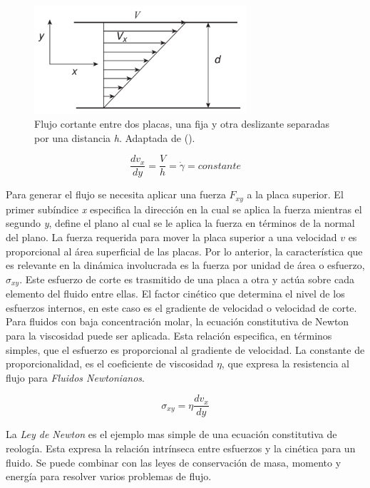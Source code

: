 \begin{figure}\centering
    \includegraphics[width=0.7\textwidth]{Graphics/reo1.png}
    \caption[Flujo entre placas]{Flujo cortante entre dos placas, una fija y otra deslizante separadas por una distancia \emph{h}. Adaptada de ().}
    \label{fig:reo1}
\end{figure}

\begin{equation}
\frac{dv_{x}}{dy}= \frac{V}{h}=\dot{\gamma}=constante
\end{equation}

Para generar el flujo se necesita aplicar una fuerza \emph{$F_{xy}$} a la placa superior. El primer subíndice \emph{x} especifica la dirección en la cual se aplica la fuerza mientras el segundo \emph{y}, define el plano al cual se le aplica la fuerza en términos de la normal del plano. La fuerza requerida para mover la placa superior a una velocidad $v$ es proporcional al área superficial de las placas. Por lo anterior, la característica que es relevante en la dinámica involucrada es la fuerza por unidad de área o esfuerzo, $\sigma_{xy}$. Este esfuerzo de corte es trasmitido de una placa a otra y actúa sobre cada elemento del fluido entre ellas. El factor cinético que determina el nivel de los esfuerzos internos, en este caso es el gradiente de velocidad o velocidad de corte. Para fluidos con baja concentración molar, la ecuación constitutiva de Newton para la viscosidad puede ser aplicada. Esta relación especifica, en términos simples, que el esfuerzo es proporcional al gradiente de velocidad. La constante de proporcionalidad, es el coeficiente de viscosidad $\eta$, que expresa la resistencia al flujo para \emph{Fluidos Newtonianos}.

\begin{equation}
\sigma_{xy}=\eta \frac{dv_{x}}{dy}
\end{equation}

La \emph{Ley de Newton} es el ejemplo mas simple de una ecuación constitutiva de reología. Esta expresa la relación intrínseca entre esfuerzos y la cinética para un fluido. Se puede combinar con las leyes de conservación de masa, momento y energía para resolver varios problemas de flujo.

